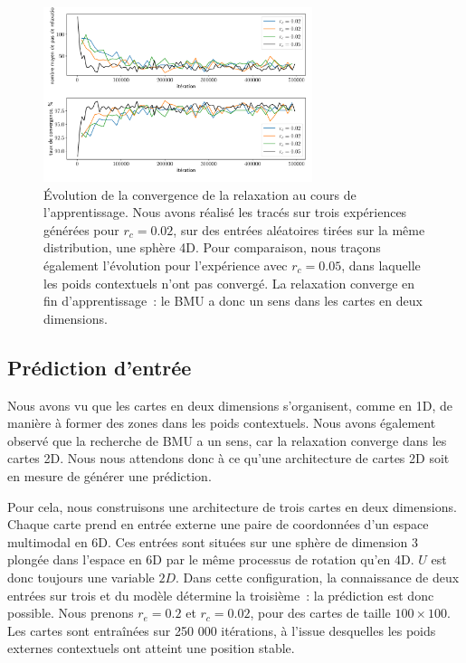 \documentclass[../main]{subfiles}
\begin{document}
\begin{figure}
	\centering
	\includegraphics[width=0.7\textwidth]{conv_relax_2maps.pdf}
	\caption{\'Evolution de la convergence de la relaxation au cours de l'apprentissage. Nous avons réalisé les tracés sur trois expériences générées pour $r_c = 0.02$, sur des entrées aléatoires tirées sur la même distribution, une sphère 4D. Pour comparaison, nous traçons également l'évolution pour l'expérience avec $r_c = 0.05$, dans laquelle les poids contextuels n'ont pas convergé. La relaxation converge en fin d'apprentissage~: le BMU a donc un sens dans les cartes en deux dimensions. \label{fig:relax}}
\end{figure}


\subsection{Prédiction d'entrée}

Nous avons vu que les cartes en deux dimensions s'organisent, comme en 1D, de manière à former des zones dans les poids contextuels. 
Nous avons également observé que la recherche de BMU a un sens, car la relaxation converge dans les cartes 2D.
Nous nous attendons donc à ce qu'une architecture de cartes 2D soit en mesure de générer une prédiction.

Pour cela, nous construisons une architecture de trois cartes en deux dimensions. Chaque carte prend en entrée externe une paire de coordonnées d'un espace multimodal en 6D. Ces entrées sont situées sur une sphère de dimension 3 plongée dans l'espace en 6D par le même processus de rotation qu'en 4D. $U$ est donc toujours une variable $2D$. 
Dans cette configuration, la connaissance de deux entrées sur trois et du modèle détermine la troisième~: la prédiction est donc possible.
Nous prenons $r_e = 0.2$ et $r_c = 0.02$, pour des cartes de taille $100 \times 100$. Les cartes sont entraînées sur 250 000 itérations, à l'issue desquelles les poids externes contextuels ont atteint une position stable.
\end{document}
